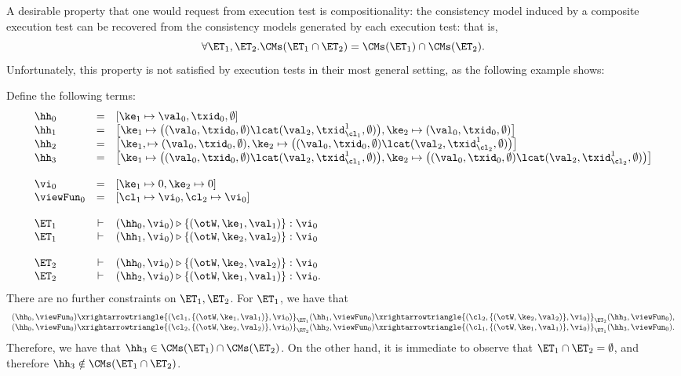 A desirable property that one would request from execution 
test is compositionality: the consistency model induced by 
a composite execution test can be recovered from the consistency 
models generated by each execution test: that is, 
\[ 
\forall \ET_1, \ET_2. \CMs(\ET_1 \cap \ET_2) = \CMs(\ET_1) \cap \CMs(\ET_2).
\]
Unfortunately, this property is not satisfied by execution tests in their 
most general setting, as the following example shows: 
\begin{example}
\label{ex:noncompositional.et}
Define the following terms: 
\[
\begin{array}{lcl}
\hh_0 &=& [\ke_1 \mapsto \val_0, \txid_0, \emptyset]\\
\hh_1 &=& \big[\ke_1 \mapsto \big( (\val_0, \txid_0, \emptyset) \lcat (\val_2, \txid_{\cl_1}^{1}, \emptyset)\big) , \ke_2 \mapsto (\val_0, \txid_0, \emptyset) \big]\\
\hh_2 &=& \big[\ke_1, \mapsto (\val_0, \txid_0, \emptyset), \ke_2 \mapsto \big( (\val_0, \txid_0, \emptyset) \lcat (\val_2, \txid_{\cl_2}^{1}, \emptyset) \big) \big]\\
\hh_3 &=& \big[\ke_1 \mapsto \big( (\val_0, \txid_0, \emptyset) \lcat (\val_2, \txid_{\cl_1}^{1}, \emptyset)\big), 
                         \ke_2 \mapsto \big( (\val_0, \txid_0, \emptyset) \lcat (\val_2, \txid_{\cl_2}^{1}, \emptyset) \big) \big]\\
&&\\
\vi_0 &=& [\ke_1 \mapsto 0, \ke_2 \mapsto 0]\\
\viewFun_0 &=& [\cl_1 \mapsto \vi_0, \cl_2 \mapsto \vi_0]\\
&&\\
\ET_1 &\vdash& (\hh_0, \vi_0) \triangleright \{(\otW, \ke_1, \val_1)\} : \vi_0\\
\ET_1 &\vdash& (\hh_1, \vi_0) \triangleright \{(\otW, \ke_2, \val_2)\} : \vi_0\\
&&\\
\ET_2 &\vdash& (\hh_0, \vi_0) \triangleright \{(\otW, \ke_2, \val_2)\} : \vi_0\\
\ET_2 &\vdash& (\hh_2, \vi_0) \triangleright \{(\otW, \ke_1, \val_1)\} : \vi_0.
\end{array}
\]
There are no further constraints on $\ET_1, \ET_2$.
For $\ET_1$, we have that 
\[
\begin{array}{l}
(\hh_0, \viewFun_0) \xrightarrowtriangle{(\cl_1, \{(\otW, \ke_1, \val_1)\}, \vi_0)}_{\ET_1} 
(\hh_1, \viewFun_0) \xrightarrowtriangle{(\cl_2, \{(\otW, \ke_2, \val_2)\}, \vi_0)}_{\ET_2} (\hh_3, \viewFun_0), \\
(\hh_0, \viewFun_0) \xrightarrowtriangle{(\cl_2, \{(\otW, \ke_2, \val_2)\}, \vi_0)}_{\ET_2} 
(\hh_2, \viewFun_0) \xrightarrowtriangle{(\cl_1, \{(\otW, \ke_1, \val_1)\}, \vi_0)}_{\ET_1} (\hh_3, \viewFun_0).\\
\end{array}
\] 
Therefore, we have that $\hh_3 \in \CMs(\ET_1) \cap \CMs(\ET_2)$. On the other hand, it is immediate 
to observe that $\ET_1 \cap \ET_2 = \emptyset$, and therefore $\hh_3 \notin \CMs(\ET_1 \cap \ET_2)$.
\end{example}
